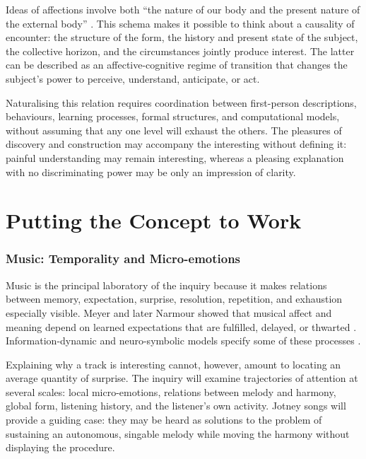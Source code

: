 \documentclass[11pt,a4paper]{article}
\begin{document}
Ideas of affections involve both ``the nature of our body and the present nature
of the external body''
\parencite[III, prop. XXVII, dem.]{spinoza1861oeuvres}. This schema makes it
possible to think about a causality of encounter: the structure of the form, the
history and present state of the subject, the collective horizon, and the
circumstances jointly produce interest. The latter can be described as an
affective-cognitive regime of transition that changes the subject's power to
perceive, understand, anticipate, or act.

Naturalising this relation requires coordination between first-person
descriptions, behaviours, learning processes, formal structures, and
computational models, without assuming that any one level will exhaust the
others. The pleasures of discovery and construction
\parencite{feynman1999pleasure,florman1996existential} may accompany the
interesting without defining it: painful understanding may remain interesting,
whereas a pleasing explanation with no discriminating power may be only an
impression of clarity.

\part{Putting the Concept to Work}

\section{Music: Temporality and Micro-emotions}

Music is the principal laboratory of the inquiry because it makes relations
between memory, expectation, surprise, resolution, repetition, and exhaustion
especially visible. Meyer and later Narmour showed that musical affect and
meaning depend on learned expectations that are fulfilled, delayed, or thwarted
\parencite{meyer1956emotion,narmour1990basic,narmour1992complexity}.
Information-dynamic and neuro-symbolic models specify some of these processes
\parencite{abdallah2009information,berger1999expectations,gang1999unified}.

Explaining why a track is interesting cannot, however, amount to locating an
average quantity of surprise. The inquiry will examine trajectories of
attention at several scales: local micro-emotions, relations between melody and
harmony, global form, listening history, and the listener's own activity.
Jotney songs will provide a guiding case: they may be heard as solutions to the
problem of sustaining an autonomous, singable melody while moving the harmony
without displaying the procedure.
\end{document}
